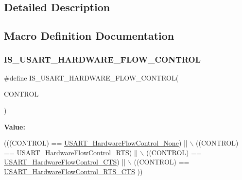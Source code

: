 \subsection{Detailed Description}


\subsection{Macro Definition Documentation}
\mbox{\label{group___u_s_a_r_t___hardware___flow___control_ga9b905eb465780173a2e98bc8b602c030}} 
\subsubsection{\texorpdfstring{I\+S\+\_\+\+U\+S\+A\+R\+T\+\_\+\+H\+A\+R\+D\+W\+A\+R\+E\+\_\+\+F\+L\+O\+W\+\_\+\+C\+O\+N\+T\+R\+OL}{IS\_USART\_HARDWARE\_FLOW\_CONTROL}}
{\footnotesize\ttfamily \#define I\+S\+\_\+\+U\+S\+A\+R\+T\+\_\+\+H\+A\+R\+D\+W\+A\+R\+E\+\_\+\+F\+L\+O\+W\+\_\+\+C\+O\+N\+T\+R\+OL(\begin{DoxyParamCaption}\item[{}]{C\+O\+N\+T\+R\+OL }\end{DoxyParamCaption})}

{\bfseries Value\+:}
\begin{DoxyCode}
(((CONTROL) == \hyperlink{group___u_s_a_r_t___hardware___flow___control_gaf3deaf4429b88db7753ee203f4797bd3}{USART\_HardwareFlowControl\_None}) || \(\backslash\)
                               ((CONTROL) == \hyperlink{group___u_s_a_r_t___hardware___flow___control_ga22d4339693e3356d992abca259b0418e}{USART\_HardwareFlowControl\_RTS}) ||
       \(\backslash\)
                               ((CONTROL) == \hyperlink{group___u_s_a_r_t___hardware___flow___control_ga4d989f112f94009c0849fe4dbe829d81}{USART\_HardwareFlowControl\_CTS}) ||
       \(\backslash\)
                               ((CONTROL) == \hyperlink{group___u_s_a_r_t___hardware___flow___control_ga2986aed8c6cba414ac8afe0180ab553e}{USART\_HardwareFlowControl\_RTS\_CTS}
      ))
\end{DoxyCode}


